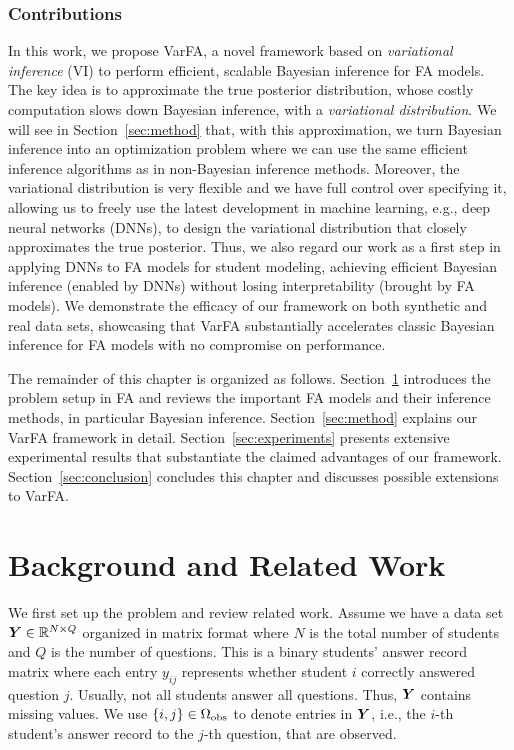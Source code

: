 \subsubsection*{Contributions}
In this work, we propose VarFA, a novel framework based on \textit{variational
    inference} (VI) to perform efficient, scalable Bayesian inference for FA
models. The key idea is to approximate the true posterior distribution, whose
costly computation slows down Bayesian inference, with a \textit{variational
    distribution}. We will see in Section~\ref{sec:method} that, with this
approximation, we turn Bayesian inference into an optimization problem where we
can use the same efficient inference algorithms as in non-Bayesian inference
methods. Moreover, the variational distribution is very flexible and we have
full control over specifying it, allowing us to freely use the latest development in
machine learning, e.g., deep neural networks (DNNs), to design the variational
distribution that closely approximates the true posterior. Thus, we also regard
our work as a first step in applying DNNs to FA models for student modeling,
achieving efficient Bayesian inference (enabled by DNNs) without losing
interpretability (brought by FA models).
%
We demonstrate the efficacy of our framework on both synthetic and real data
sets, showcasing that VarFA substantially accelerates classic Bayesian
inference for FA models with no compromise on performance.
%

The remainder of this chapter is organized as follows.
Section~\ref{sec:related-work} introduces the problem setup in FA and reviews
the important FA models and their inference methods, in particular Bayesian
inference. Section~\ref{sec:method} explains our VarFA framework in detail.
Section~\ref{sec:experiments} presents extensive experimental results that
substantiate the claimed advantages of our framework.
Section~\ref{sec:conclusion} concludes this chapter and discusses possible
extensions to VarFA.

\section{Background and Related Work}
\label{sec:related-work}
We first set up the problem and review related work. Assume we have a data set ${\bm{Y}}\in\mathbb{R}^{N\times Q}$ organized in matrix format where $N$ is the total number of students and $Q$ is the number of questions. This is a binary students' answer record matrix where each entry $y_{ij}$ represents whether student $i$ correctly answered question $j$. Usually, not all students answer all questions. Thus, ${\bm{Y}}$ contains missing values. We use $\{i,j\}\in\Omega_{\rm obs}$ to denote entries in ${\bm{Y}}$, i.e., the $i$-th student's answer record to the $j$-th question, that are observed.


